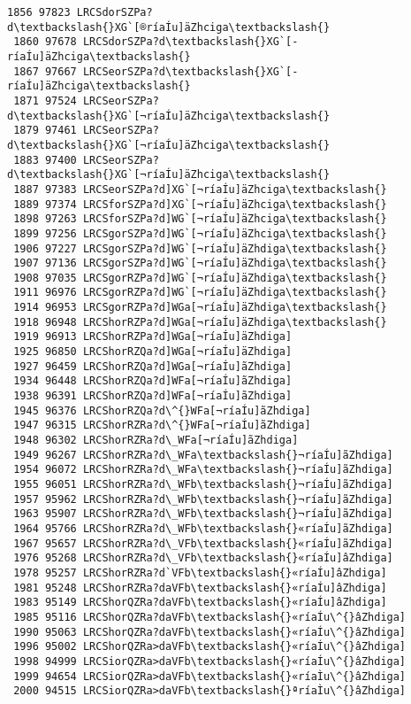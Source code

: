\documentclass[11pt]{article}
\begin{document}
\begin{Verbatim}[commandchars=\\\{\}]
 1856 97823 LRCSdorSZPa?d\textbackslash{}XG`[®ríaÍu]äZhciga\textbackslash{}
 1860 97678 LRCSdorSZPa?d\textbackslash{}XG`[­ríaÍu]äZhciga\textbackslash{}
 1867 97667 LRCSeorSZPa?d\textbackslash{}XG`[­ríaÍu]äZhciga\textbackslash{}
 1871 97524 LRCSeorSZPa?d\textbackslash{}XG`[¬ríaÍu]äZhciga\textbackslash{}
 1879 97461 LRCSeorSZPa?d\textbackslash{}XG`[¬ríaÍu]äZhciga\textbackslash{}
 1883 97400 LRCSeorSZPa?d\textbackslash{}XG`[¬ríaÍu]äZhciga\textbackslash{}
 1887 97383 LRCSeorSZPa?d]XG`[¬ríaÍu]äZhciga\textbackslash{}
 1889 97374 LRCSforSZPa?d]XG`[¬ríaÍu]äZhciga\textbackslash{}
 1898 97263 LRCSforSZPa?d]WG`[¬ríaÍu]äZhciga\textbackslash{}
 1899 97256 LRCSgorSZPa?d]WG`[¬ríaÍu]äZhciga\textbackslash{}
 1906 97227 LRCSgorSZPa?d]WG`[¬ríaÍu]äZhdiga\textbackslash{}
 1907 97136 LRCSgorSZPa?d]WG`[¬ríaÍu]äZhdiga\textbackslash{}
 1908 97035 LRCSgorRZPa?d]WG`[¬ríaÍu]äZhdiga\textbackslash{}
 1911 96976 LRCSgorRZPa?d]WG`[¬ríaÍu]äZhdiga\textbackslash{}
 1914 96953 LRCSgorRZPa?d]WGa[¬ríaÍu]äZhdiga\textbackslash{}
 1918 96948 LRCShorRZPa?d]WGa[¬ríaÍu]äZhdiga\textbackslash{}
 1919 96913 LRCShorRZPa?d]WGa[¬ríaÍu]äZhdiga]
 1925 96850 LRCShorRZQa?d]WGa[¬ríaÍu]äZhdiga]
 1927 96459 LRCShorRZQa?d]WGa[¬ríaÍu]ãZhdiga]
 1934 96448 LRCShorRZQa?d]WFa[¬ríaÍu]ãZhdiga]
 1938 96391 LRCShorRZQa?d]WFa[¬ríaÍu]ãZhdiga]
 1945 96376 LRCShorRZQa?d\^{}WFa[¬ríaÍu]ãZhdiga]
 1947 96315 LRCShorRZRa?d\^{}WFa[¬ríaÍu]ãZhdiga]
 1948 96302 LRCShorRZRa?d\_WFa[¬ríaÍu]ãZhdiga]
 1949 96267 LRCShorRZRa?d\_WFa\textbackslash{}¬ríaÍu]ãZhdiga]
 1954 96072 LRCShorRZRa?d\_WFa\textbackslash{}¬ríaÍu]ãZhdiga]
 1955 96051 LRCShorRZRa?d\_WFb\textbackslash{}¬ríaÍu]ãZhdiga]
 1957 95962 LRCShorRZRa?d\_WFb\textbackslash{}¬ríaÍu]ãZhdiga]
 1963 95907 LRCShorRZRa?d\_WFb\textbackslash{}¬ríaÍu]ãZhdiga]
 1964 95766 LRCShorRZRa?d\_WFb\textbackslash{}«ríaÍu]ãZhdiga]
 1967 95657 LRCShorRZRa?d\_VFb\textbackslash{}«ríaÍu]ãZhdiga]
 1976 95268 LRCShorRZRa?d\_VFb\textbackslash{}«ríaÍu]âZhdiga]
 1978 95257 LRCShorRZRa?d`VFb\textbackslash{}«ríaÍu]âZhdiga]
 1981 95248 LRCShorRZRa?daVFb\textbackslash{}«ríaÍu]âZhdiga]
 1983 95149 LRCShorQZRa?daVFb\textbackslash{}«ríaÍu]âZhdiga]
 1985 95116 LRCShorQZRa?daVFb\textbackslash{}«ríaÍu\^{}âZhdiga]
 1990 95063 LRCShorQZRa?daVFb\textbackslash{}«ríaÍu\^{}âZhdiga]
 1996 95002 LRCShorQZRa>daVFb\textbackslash{}«ríaÍu\^{}âZhdiga]
 1998 94999 LRCSiorQZRa>daVFb\textbackslash{}«ríaÍu\^{}âZhdiga]
 1999 94654 LRCSiorQZRa>daVFb\textbackslash{}«ríaÌu\^{}âZhdiga]
 2000 94515 LRCSiorQZRa>daVFb\textbackslash{}ªríaÌu\^{}âZhdiga]

\end{Verbatim}
\end{document}
